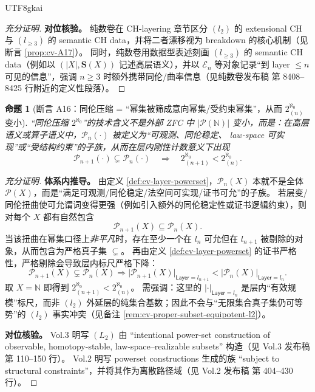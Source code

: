 \documentclass[12pt]{article}
\newtheorem{proposition}{命题}[section]
\begin{document}
\begin{CJK*}{UTF8}{gkai}
\begin{proof}[充分证明]
\textbf{对位核验。}
纯数卷在 CH-layering 章节区分 $(l_2)$ 的 extensional CH 与 $(l_{\ge3})$ 的 semantic CH data，并将二者漂移视为 breakdown 的核心机制（见断言 \ref{prop:cv-A17}）。
同时，纯数卷用数据型表述刻画 $(l_{\ge3})$ 的 semantic CH data（例如以 $(|X|,\mathbf S(X))$ 记述高层语义），并以 $\mathcal E_n$ 等对象记录“到 layer $\le n$
  可见的信息”，强调 $n\ge3$ 时额外携带同伦/曲率信息（见纯数卷发布稿\cite{GaoZheng2025GFramework} 第 8408--8425 行附近的定义性段落）。
\end{proof}

\begin{proposition}[断言 A16：同伦压缩 = “幂集被筛成意向幂集/受约束幂集”，从而 $2^{\aleph_0}_{(n)}$ 变小]\label{prop:cv-A16}
“同伦压缩 $2^{\aleph_0}$”的技术含义不是外部 ZFC 中 $|\mathcal P(\mathbb N)|$ 变小，而是：在高层语义或算子语义中，$\mathcal P_n(\cdot)$ 被定义为“可观测、同伦稳定、
  law-space 可实现”或“受结构约束”的子族，从而在层内刚性计数意义下出现
\[
  \mathcal P_{n+1}(\cdot)\subsetneq \mathcal P_n(\cdot)
  \quad\Longrightarrow\quad
  2^{\aleph_0}_{(n+1)}<2^{\aleph_0}_{(n)}.
\]
\end{proposition}

\begin{proof}[充分证明]
\textbf{体系内推导。}
由定义 \ref{def:cv-layer-powerset}，$\mathcal P_n(X)$ 本就不是全体 $\mathcal P(X)$，而是“满足可观测/同伦稳定/法空间可实现/证书可允”的子族。
若层变/同伦扭曲使可允谓词变得更强（例如引入额外的同伦稳定性或证书逻辑约束），则对每个 $X$ 都有自然包含
\[
  \mathcal P_{n+1}(X)\subseteq \mathcal P_n(X).
\]
当该扭曲在幂集口径上\emph{非平凡}时，存在至少一个在 $l_n$ 可允但在 $l_{n+1}$ 被剔除的对象，从而包含为严格真子集 $\subsetneq$。
再由定义 \ref{def:cv-layer-powerset} 的证书严格性，严格剔除会导致层内标尺严格下降：
\[
  \mathcal P_{n+1}(X)\subsetneq \mathcal P_n(X)
  \Longrightarrow
  \bigl|\mathcal P_{n+1}(X)\bigr|_{\mathsf{Layer}=l_{n+1}}
  <\bigl|\mathcal P_n(X)\bigr|_{\mathsf{Layer}=l_n}.
\]
取 $X=\mathbb N$ 即得到 $2^{\aleph_0}_{(n+1)}<2^{\aleph_0}_{(n)}$。
需强调：这里的 $|\cdot|_{\mathsf{Layer}=l_n}$ 是层内“有效规模”标尺，而非 $(l_2)$ 外延层的纯集合基数；因此不会与“无限集合真子集仍可等势”的 $(l_2)$ 事实冲突（见备注 \ref{rem:cv-proper-subset-equipotent-l2}）。

\textbf{对位核验。}
Vol.3 明写 $(L_2)$ 由 “intentional power-set construction of observable, homotopy-stable, law-space--realizable subsets”
  构造（见 Vol.3 发布稿\cite{GaoZhengAppVol3} 第 110--150 行）。
Vol.2 明写 powerset constructions 生成的族 “subject to structural constraints”，并将其作为离散路径域（见 Vol.2 发布稿\cite{GaoZhengAppVol2} 第
  404--430 行）。
\end{proof}


\end{CJK*}
\end{document}

